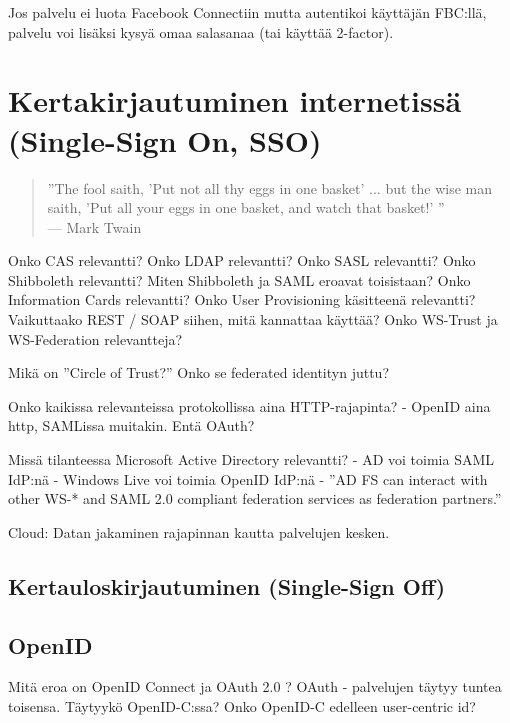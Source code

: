 \documentclass[english,gradu]{tktltiki}
\begin{document}
  Jos palvelu ei luota Facebook Connectiin mutta autentikoi käyttäjän FBC:llä, palvelu voi lisäksi kysyä omaa salasanaa (tai käyttää 2-factor).



\section{Kertakirjautuminen internetissä (Single-Sign On, SSO)} %
\label{sec:Kertakirjautumisstandardit}
  \begin{quote}
      ''The fool saith, 'Put not all thy eggs in one basket' ...
      but the wise man saith, 'Put all your eggs in one basket, and watch that basket!' ''
      \\--- Mark Twain \cite{twain_eggs_1894}
  \end{quote}

  Onko CAS relevantti?
  Onko LDAP relevantti?
  Onko SASL relevantti?
  Onko Shibboleth relevantti? %
  Miten Shibboleth ja SAML eroavat toisistaan? %
  Onko Information Cards relevantti?
  Onko User Provisioning käsitteenä relevantti?
  Vaikuttaako REST / SOAP siihen, mitä kannattaa käyttää?
  Onko WS-Trust ja WS-Federation relevantteja?

  Mikä on ''Circle of Trust?'' Onko se federated identityn juttu?

  Onko kaikissa relevanteissa protokollissa aina HTTP-rajapinta?
  - OpenID aina http, SAMLissa muitakin. Entä OAuth?

  Missä tilanteessa Microsoft Active Directory relevantti?
  - AD voi toimia SAML IdP:nä
  - Windows Live voi toimia OpenID IdP:nä
  - ''AD FS can interact with other WS-* and SAML 2.0 compliant federation services as federation partners.''

  Cloud: Datan jakaminen rajapinnan kautta palvelujen kesken.

  \subsection{Kertauloskirjautuminen (Single-Sign Off)} %
  \label{sub:kertauloskirjautuminen}

  \subsection{OpenID} %
  \label{sub:openid}
  Mitä eroa on OpenID Connect ja OAuth 2.0 ?
  OAuth - palvelujen täytyy tuntea toisensa. Täytyykö OpenID-C:ssa?
  Onko OpenID-C edelleen user-centric id?
\end{document}
